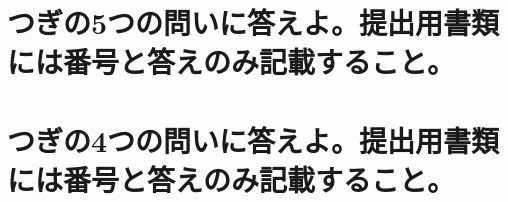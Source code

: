 \documentclass[titlepage,a4paper]{jsarticle}
\begin{document}
\section{つぎの5つの問いに答えよ。提出用書類には番号と答えのみ記載すること。}%
\section{つぎの4つの問いに答えよ。提出用書類には番号と答えのみ記載すること。}
\end{document}
